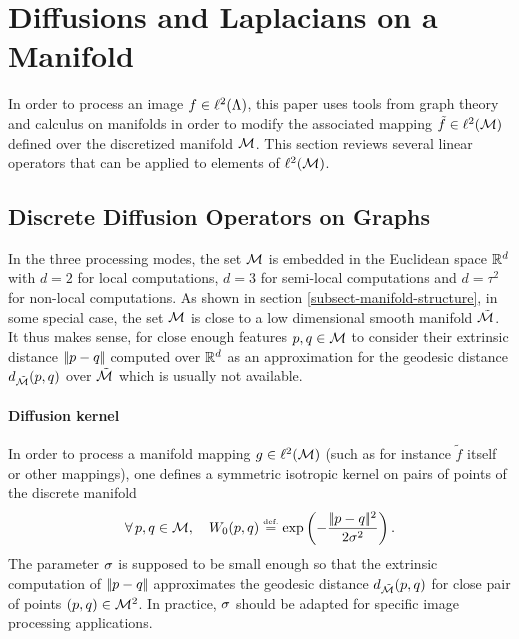 \documentclass[final]{siamltex}
\newcommand{\manilift}{\phi_f}
\newcommand{\lifted}{\tilde f}
\begin{document}
\section{Diffusions and Laplacians on a Manifold}

\label{subsec-diffusion-laplacians}

In order to process an image $f \in \ell^2(\Lambda)$, this paper uses tools from graph theory and calculus on manifolds in order to modify the associated mapping $\lifted \in \ldeux(\Mm)$ defined over the discretized manifold $\mathcal{M}$. This section reviews several linear operators that can be applied to elements of $\ell^2(\mathcal{M})$.


\subsection{Discrete Diffusion Operators on Graphs}
\label{subsect-discrete-diffusion}


In the three processing modes, the set $\mathcal{M}$ is embedded in the Euclidean space $\mathbb{R}^{d}$ with $d = 2$ for local computations, $d=3$ for semi-local computations and $d=\tau^2$ for non-local computations. As shown in section \ref{subsect-manifold-structure}, in some special case, the set $\mathcal{M}$ is close to a low dimensional smooth manifold $\tilde {\mathcal{M}}$. It thus makes sense, for close enough features $p,q \in \mathcal{M}$ to consider their extrinsic distance $|\!| p-q |\!|$ computed over $\mathbb{R}^{d}$ as an approximation for the geodesic distance $d_{\tilde {\mathcal{M}}}(p,q)$ over $\tilde {\mathcal{M}}$ which is usually not available. 

\paragraph{Diffusion kernel}

In order to process a manifold mapping $g \in \ell^2(\mathcal{M})$ (such as for instance $\lifted$ itself or other mappings), one defines a symmetric isotropic kernel on pairs of points of the discrete manifold
\begin{equation}
	\label{eq-defn-continuous-kernel}
	\foralls p,q \in \Mm, \quad W_0(p,q) \eqdef \exp\pa{ -\frac{\norm{p-q}^2}{2\si^2} }.
\end{equation}
The parameter $\sigma$ is supposed to be small enough so that the extrinsic computation of $|\!| p-q |\!|$ approximates the geodesic distance $d_{\tilde {\mathcal{M}}}(p,q)$ for close pair of points $(p,q) \in \mathcal{M}^2$. In practice, $\sigma$  should be adapted for specific image processing applications. 
\end{document}
